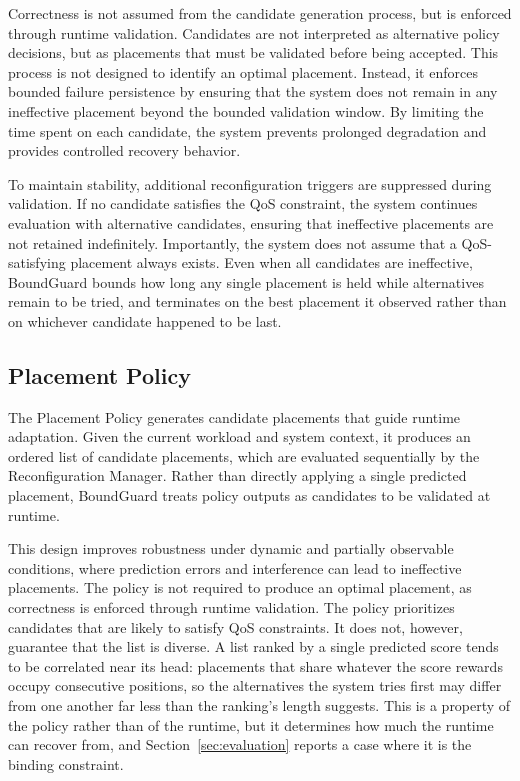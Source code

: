 \documentclass[conference]{IEEEtran}
\begin{document}
Correctness is not assumed from the candidate generation process, but is enforced through runtime validation. 
Candidates are not interpreted as alternative policy decisions, but as placements that must be validated before being accepted.
%
This process is not designed to identify an optimal placement. 
Instead, it enforces bounded failure persistence by ensuring that the system does not remain in any ineffective placement beyond the bounded validation window. 
By limiting the time spent on each candidate, the system prevents prolonged degradation and provides controlled recovery behavior.

To maintain stability, additional reconfiguration triggers are suppressed during validation. 
If no candidate satisfies the QoS constraint, the system continues evaluation with alternative candidates, ensuring that ineffective placements are not retained indefinitely.
%
Importantly, the system does not assume that a QoS-satisfying placement always exists. 
Even when all candidates are ineffective, BoundGuard bounds how long any single placement is held while alternatives remain to be tried, \textcolor{navyblue}{and terminates on the best placement it observed rather than on whichever candidate happened to be last.}

\subsection{Placement Policy}
\label{sec:placement_policy}
The Placement Policy generates candidate placements that guide runtime adaptation.
Given the current workload and system context, it produces an ordered list of candidate placements, which are evaluated sequentially by the Reconfiguration Manager.
Rather than directly applying a single predicted placement, BoundGuard treats policy outputs as candidates to be validated at runtime.

This design improves robustness under dynamic and partially observable conditions, where prediction errors and interference can lead to ineffective placements.
The policy is not required to produce an optimal placement, as correctness is enforced through runtime validation.
The policy prioritizes candidates that are likely to satisfy QoS constraints. \textcolor{navyblue}{It does not, however, guarantee that the list is diverse. A list ranked by a single predicted score tends to be correlated near its head: placements that share whatever the score rewards occupy consecutive positions, so the alternatives the system tries first may differ from one another far less than the ranking's length suggests. This is a property of the policy rather than of the runtime, but it determines how much the runtime can recover from, and Section~\ref{sec:evaluation} reports a case where it is the binding constraint.}
\end{document}
